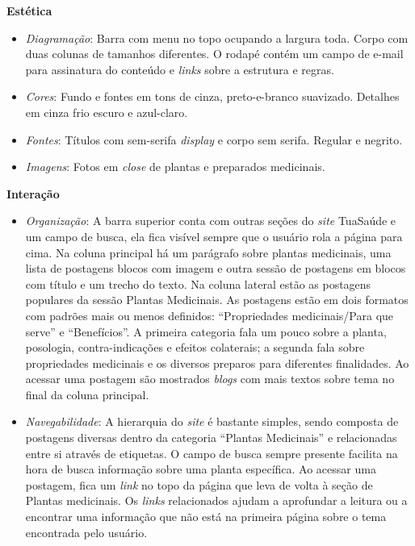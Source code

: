 \textbf{Estética}

\begin{itemize}
\item
  \emph{Diagramação}: Barra com menu no topo ocupando a largura toda. Corpo com duas colunas de tamanhos diferentes. O rodapé contém um campo de e-mail para assinatura do conteúdo e \emph{links} sobre a estrutura e regras.
\item
  \emph{Cores}: Fundo e fontes em tons de cinza, preto-e-branco suavizado. Detalhes em cinza frio escuro e azul-claro.
\item
  \emph{Fontes}: Títulos com sem-serifa \emph{display} e corpo sem serifa. Regular e negrito.
\item
  \emph{Imagens}: Fotos em \emph{close} de plantas e preparados medicinais.
\end{itemize}

\textbf{Interação}

\begin{itemize}
\item
  \emph{Organização}: A barra superior conta com outras seções do \emph{site} TuaSaúde e um campo de busca, ela fica visível sempre que o usuário rola a página para cima. Na coluna principal há um parágrafo sobre plantas medicinais, uma lista de postagens blocos com imagem e outra sessão de postagens em blocos com título e um trecho do texto. Na coluna lateral estão as postagens populares da sessão Plantas Medicinais. As postagens estão em dois formatos com padrões mais ou menos definidos: ``Propriedades medicinais/Para que serve'' e ``Benefícios''. A primeira categoria fala um pouco sobre a planta, posologia, contra-indicações e efeitos colaterais; a segunda fala sobre propriedades medicinais e os diversos preparos para diferentes finalidades. Ao acessar uma postagem são mostrados \emph{blogs} com mais textos sobre tema no final da coluna principal.
\item
  \emph{Navegabilidade}: A hierarquia do \emph{site} é bastante simples, sendo composta de postagens diversas dentro da categoria ``Plantas Medicinais'' e relacionadas entre si através de etiquetas. O campo de busca sempre presente facilita na hora de busca informação sobre uma planta específica. Ao acessar uma postagem, fica um \emph{link} no topo da página que leva de volta à seção de Plantas medicinais. Os \emph{links} relacionados ajudam a aprofundar a leitura ou a encontrar uma informação que não está na primeira página sobre o tema encontrada pelo usuário.
\end{itemize}

